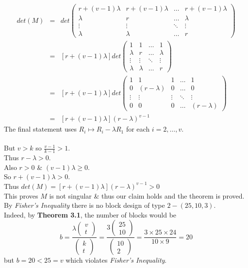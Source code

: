 \documentclass[11pt,a4paper]{article}
\begin{document}
\[\begin{array}{rcl}
det(M)&=&det\begin{pmatrix}r+(v-1)\lambda&r+(v-1)\lambda&\dots&r+(v-1)\lambda\\\lambda&r&\dots&\lambda\\\vdots&\vdots&\ddots&\vdots\\\lambda&\lambda&\dots&r\end{pmatrix}\\
&=&[r+(v-1)\lambda]det\begin{pmatrix}1&1&\dots&1\\\lambda&r&\dots&\lambda\\\vdots&\vdots&\ddots&\vdots\\\lambda&\lambda&\dots&r\end{pmatrix}\\
&=&[r+(v-1)\lambda]det\begin{pmatrix}1&1&1&\dots&1\\
0&(r-\lambda)&0&\dots&0\\\vdots&\vdots&\vdots&\ddots&\vdots\\0&0&0&\dots&(r-\lambda)\end{pmatrix}\\
&=&[r+(v-1)\lambda](r-\lambda)^{v-1}
\end{array}\]
The final statement uses $R_i\mapsto R_i-\lambda R_1$ for each $i=2,\dots,v$.\\
\\
But $v>k$ so $\frac{v-1}{k-1}>1$.\\
Thus $r-\lambda>0$.\\
Also $r>0$ \& $(v-1)\lambda\geq0$.\\
So $r+(v-1)\lambda>0$.\\
Thus $det(M)=[r+(v-1)\lambda](r-\lambda)^{v-1}>0$\\
This proves $M$ is not singular \& thus our claim holds and the theorem is proved.\\

By \textit{Fisher's Inequality} there is no block design of type $2-(25,10,3)$.\\
Indeed, by \textbf{Theorem 3.1}, the number of blocks would be
$$b=\frac{\lambda\begin{pmatrix}v\\t\end{pmatrix}}{\begin{pmatrix}k\\t\end{pmatrix}}=\frac{3\begin{pmatrix}25\\10\end{pmatrix}}{\begin{pmatrix}10\\2\end{pmatrix}}=\frac{3\times25\times24}{10\times9}=20$$
but $b=20<25=v$ which violates \textit{Fisher's Inequality}.\\
\end{document}
